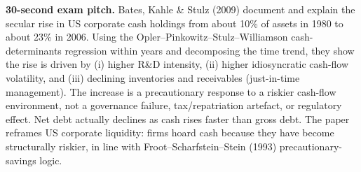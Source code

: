 \documentclass[11pt]{article}
\begin{document}
\begin{keybox}
\textbf{30-second exam pitch.} Bates, Kahle \& Stulz (2009) document and explain the secular rise in US corporate cash holdings from about 10\% of assets in 1980 to about 23\% in 2006. Using the Opler--Pinkowitz--Stulz--Williamson cash-determinants regression within years and decomposing the time trend, they show the rise is driven by (i) higher R\&D intensity, (ii) higher idiosyncratic cash-flow volatility, and (iii) declining inventories and receivables (just-in-time management). The increase is a precautionary response to a riskier cash-flow environment, not a governance failure, tax/repatriation artefact, or regulatory effect. Net debt actually declines as cash rises faster than gross debt. The paper reframes US corporate liquidity: firms hoard cash because they have become structurally riskier, in line with Froot--Scharfstein--Stein (1993) precautionary-savings logic.
\end{keybox}
\end{document}
